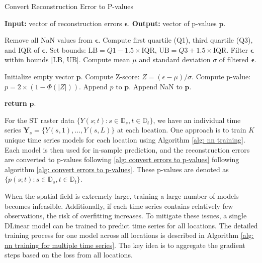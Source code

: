 \documentclass[11pt]{article}
\begin{document}
\begin{algorithm}
\caption{Convert Reconstruction Error to P-values}\label{alg: convert errors to p-values}
\begin{algorithmic}[1]
\State \textbf{Input:} vector of reconstruction errors $\bm{\epsilon}$.
\State \textbf{Output:} vector of p-values $\bm{p}$.

\State Remove all NaN values from $\bm{\epsilon}$.
\State Compute first quartile (Q1), third quartile (Q3), and IQR of $\bm{\epsilon}$.
\State Set bounds: $\text{LB} = Q1 - 1.5 \times \text{IQR}$, $\text{UB} = Q3 + 1.5 \times \text{IQR}$.
\State Filter $\bm{\epsilon}$ within bounds [$\text{LB}$, $\text{UB}$].
\State Compute mean $\mu$ and standard deviation $\sigma$ of filtered $\bm{\epsilon}$.

\State Initialize empty vector $\bm{p}$.
\For{$\epsilon \in \bm{\epsilon}$}
        \State Compute Z-score: $Z = (\epsilon - \mu)/\sigma$.
        \State Compute p-value: $p = 2 \times (1 - \Phi(|Z|))$.
        \State Append $p$ to $\bm{p}$.
    \Else
        \State Append NaN to $\bm{p}$.
    \EndIf
\EndFor

\State \textbf{return} $\bm{p}$.
\end{algorithmic}
\end{algorithm}


For the ST raster data $\{Y(s;t):s\in \mathbb{D}_s, t\in \mathbb{D}_t\}$, we have an individual time series $\bm{Y}_s=\{Y(s,1),\ldots, Y(s,L)\}$ at each location. One approach is to train $K$ unique time series models for each location using Algorithm \ref{alg: nn training}. Each model is then used for in-sample prediction, and the reconstruction errors are converted to p-values following \ref{alg: convert errors to p-values} following algorithm \ref{alg: convert errors to p-values}. These p-values are denoted as $\{p(s;t):s\in \mathbb{D}_s, t\in \mathbb{D}_t\}$. 

When the spatial field is extremely large, training a large number of models becomes infeasible. Additionally, if each time series contains relatively few observations, the risk of overfitting increases. To mitigate these issues, a single DLinear model can be trained to predict time series for all locations. The detailed training process for one model across all locations is described in Algorithm \ref{alg: nn training for multiple time series}. The key idea is to aggregate the gradient steps based on the loss from all locations.
\end{document}
